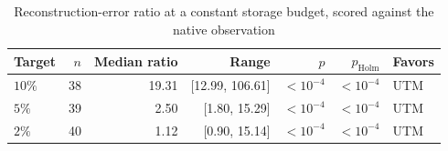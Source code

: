 \begin{table}[t]
\centering
\caption{Reconstruction-error ratio at a constant storage budget, scored against the native observation}
\label{tab:error_at_size_common}
\footnotesize
\setlength{\tabcolsep}{3pt}
\begin{tabular}{lrrrrrl}
\toprule
Target & $n$ & Median ratio & Range & $p$ & $p_{\mathrm{Holm}}$ & Favors \\
\midrule
$10\%$ & 38 & 19.31 & [12.99, 106.61] & $<10^{-4}$ & $<10^{-4}$ & UTM \\
$5\%$ & 39 & 2.50 & [1.80, 15.29] & $<10^{-4}$ & $<10^{-4}$ & UTM \\
$2\%$ & 40 & 1.12 & [0.90, 15.14] & $<10^{-4}$ & $<10^{-4}$ & UTM \\
\bottomrule
\end{tabular}
\end{table}
